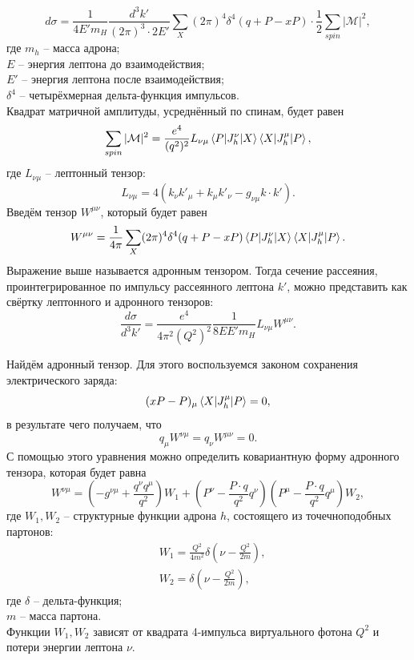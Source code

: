 \documentclass{extarticle}
\begin{document}
\begin{equation}
	d\sigma = \frac{1}{4E' m_H} \frac{d^3k'}{(2\pi)^3 \cdot 2E'} \sum_X (2\pi)^4 \delta^4(q+P-xP) \cdot \frac{1}{2} \sum_{spin} |\mathcal{M}|^2,
\end{equation}
где $m_h$ -- масса адрона; \\ $E$ -- энергия лептона до взаимодействия; \\ $E'$ -- энергия лептона после взаимодействия; \\  $\delta^4$ -- четырёхмерная дельта-функция импульсов. \\
Квадрат матричной амплитуды, усреднённый по спинам, будет равен
\begin{equation}
	\sum_{spin} |\mathcal{M}|^2 = \frac{e^4}{(q^2)^2}L_{\nu \mu}\braket{P | J_h^\nu | X} \braket{X | J_h^\mu | P}, 
	\label{eq:lepton}
\end{equation}
где $L_{\nu\mu}$ -- лептонный тензор:
\begin{equation}
	L_{\nu\mu} = 4 (k_\nu k'_\mu + k_\mu k'_\nu - g_{\nu\mu}k\cdot k').
\end{equation}
Введём тензор $W^{\mu\nu}$, который будет равен
\begin{equation}
	W^{\mu\nu} = \frac{1}{4\pi} \sum_X (2\pi)^4 \delta^4(q+P-xP) \braket{P | J_h^\nu | X} \braket{X | J_h^\mu | P}.
\end{equation}
Выражение выше называется адронным тензором. Тогда сечение рассеяния, проинтегрированное по импульсу рассеянного лептона $k'$, можно представить как свёртку лептонного и адронного тензоров:
\begin{equation}
	\frac{d\sigma}{d^3 k'} = \frac{e^4}{4\pi^2(Q^2)^2} \frac{1}{8EE'm_H}L_{\nu\mu}W^{\mu\nu}.
\end{equation}

Найдём адронный тензор. Для этого воспользуемся законом сохранения электрического заряда:
\begin{equation}
	(xP-P)_\mu \braket{X | J_h^\mu | P} = 0,
\end{equation}
в результате чего получаем, что 
\begin{equation}
	q_\mu W^{\nu \mu} = q_\nu W^{\mu \nu} = 0. 
\end{equation}
С помощью этого уравнения можно определить ковариантную форму адронного тензора, которая будет равна
\begin{equation}
	W^{\nu \mu} = (-g^{\nu\mu}+ \frac{q^\nu q^\mu}{q^2})W_1 + (P^\nu - \frac{P\cdot q}{q^2}q^\nu)(P^\mu - \frac{P\cdot q}{q^2} q^\mu) W_2,
\end{equation}
где $W_1, W_2$ -- структурные функции адрона $h$, состоящего из точечноподобных партонов:
\begin{equation}
\begin{split}
	& W_1  =   \frac{Q^2}{4m^2} \delta(\nu - \frac{Q^2}{2m}), \\
	& W_2  =  \delta(\nu - \frac{Q^2}{2m}),
\end{split}
	\label{eq:deltastruct}
\end{equation}
где $\delta$ -- дельта-функция; \\ $m$ -- масса партона. \\ Функции $W_1, W_2$ зависят от квадрата 4-импульса виртуального фотона $Q^2$ и потери энергии лептона $\nu$.
\end{document}
